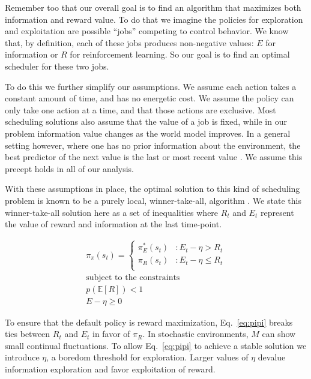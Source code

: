\documentclass[fleqn,10pt]{wlscirep}
\begin{document}
Remember too that our overall goal is to find an algorithm that maximizes both information and reward value. To do that we imagine the policies for exploration and exploitation are possible ``jobs'' competing to control behavior. We know that, by definition, each of these jobs produces non-negative values: $E$ for information or $R$ for reinforcement learning. So our goal is to find an optimal scheduler for these two jobs. 

To do this we further simplify our assumptions. We assume each action takes a constant amount of time, and has no energetic cost. We assume the policy can only take one action at a time, and that those actions are exclusive. Most scheduling solutions also assume that the value of a job is fixed, while in our problem information value changes as the world model improves. In a general setting however, where one has no prior information about the environment, the best predictor of the next value is the last or most recent value \cite{Hocker2019,Roughgarden2019}. We assume this precept holds in all of our analysis.

With these assumptions in place, the optimal solution to this kind of scheduling problem is known to be a purely local, winner-take-all, algorithm \cite{Bellmann1954,Roughgarden2019}. We state this winner-take-all solution here as a set of inequalities where $R_t$ and $E_t$ represent the value of reward and information at the last time-point.

\begin{equation}
\label{eq:pipi} 
	\begin{split}
		\pi_{\pi}(s_t) = 
		\begin{cases}
			\pi^*_E(s_t) & : E_t - \eta > R_t \\
			\pi_R(s_t) & : E_t - \eta \le R_t \\
		\end{cases}
		\\
		\text{subject to the constraints}\\
		p(\mathbb E[R]) < 1 \\
		E - \eta \geq 0
	\end{split}
\end{equation}

To ensure that the default policy is reward maximization, Eq.~\ref{eq:pipi} breaks ties between $R_t$ and $E_t$ in favor of $\pi_R$. In stochastic environments, $M$ can show small continual fluctuations. To allow Eq.~\ref{eq:pipi} to achieve a stable solution we introduce $\eta$, a boredom threshold for exploration. Larger values of $\eta$ devalue information exploration and favor exploitation of reward.
\end{document}
